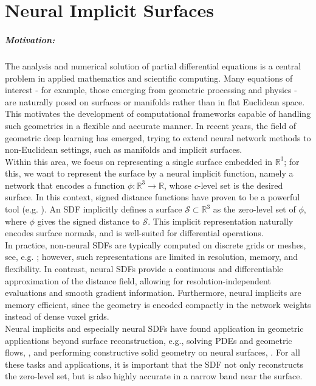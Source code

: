 \documentclass[12pt,openany]{book}
\newcommand{\R}{\mathbb{R}}
\def\S{\mathcal{S}}
\theoremstyle{plainnormal}
\theoremstyle{remark}
\begin{document}
\let\cleardoublepage\clearpage
\chapter{Neural Implicit Surfaces}\label{SectionNeuralImplicitSurf}
\paragraph*{Motivation:} 
The analysis and numerical solution of partial differential equations is a central problem in applied mathematics and scientific computing. Many equations of interest - for example, those emerging from geometric processing and physics - are naturally posed on surfaces or manifolds rather than in flat Euclidean space. This motivates the development of computational frameworks capable of handling such geometries in a flexible and accurate manner. In recent years, the field of geometric deep learning has emerged, trying to extend neural network methods to non-Euclidean settings, such as manifolds and implicit surfaces. \\
Within this area, we focus on representing a single surface embedded in $\R^3$; for this, we want to represent the surface by a neural implicit function, namely a network that encodes a function $\phi:\R^3\rightarrow\R$, whose $c$-level set is the desired surface. In this context, signed distance functions have proven to be a powerful tool (e.g. \cite{jiang2022sdfdiffdifferentiablerenderingsigned,survey_SDFs}). An SDF implicitly defines a surface $\mathcal S \subset \R^3$ as the zero-level set of $\phi$, where $\phi$ gives the signed distance to $\S$. This implicit representation naturally encodes surface normals, and is well-suited for differential operations.\\
In practice, non-neural SDFs are typically computed on discrete grids or meshes, see, e.g. \cite{FengCrane}; however, such representations are limited in resolution, memory, and flexibility. In contrast, neural SDFs provide a continuous and differentiable approximation of the distance field, allowing for resolution-independent evaluations and smooth gradient information. Furthermore, neural implicits are memory efficient, since the geometry is encoded compactly in the network weights instead of dense voxel grids.\\
Neural implicits and especially neural SDFs have found application in geometric applications beyond surface reconstruction, e.g., solving PDEs and geometric flows, \cite{mehta2022levelsettheoryneural}, and performing constructive solid geometry on neural surfaces, \cite{marschner2023constructive}. For all these tasks and applications, it is important that the SDF not only reconstructs the zero-level set, but is also highly accurate in a narrow band near the surface. \\
\end{document}
